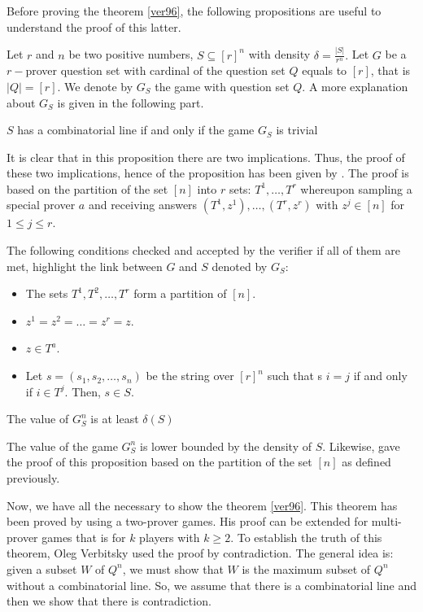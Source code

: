 Before proving the theorem \eqref{ver96}, the following propositions are useful to understand the proof of this latter.

Let $r$ and $n$ be two positive numbers,  $S \subseteq [r]^n$ with density $\delta=\frac{|S|}{r^n}.$ Let $G$ be a $r-$prover question set with  cardinal of the question set $Q$ equals to $[r]$, that is $|Q|=[r].$  We denote by $G_S$  the game with question set $Q$. A more explanation about $G_S$ is given in the following part.

\begin{pro} $S$ has a combinatorial line if and only if the game $G_S$ is trivial	 \label{pr1}	\end{pro}

It is clear that in this proposition there are two implications. Thus, the proof of these two implications, hence of the  proposition has been given by \cite{hkazla2016forbidden}. The proof is based on the partition of the set $[n]$ into $r$ sets: $T^1, \ldots, T^r$ whereupon sampling a special prover $a$ and receiving answers $(T^1, z^1), \ldots, (T^r, z^r)$ with $z^j \in [n]$ for $1\leq j \leq r.$ 

The following conditions checked and accepted  by the verifier  if all of them are met, highlight  the link between $G$ and $S$ denoted by $G_S$:
\begin{itemize}
\item The sets $T^1, T^2,\ldots, T^r$ form a partition of $[n].$
\item $z^1=z^2=\ldots=z^r=z.$
\item $z \in T^a.$
\item Let $s = (s_1, s_2, \ldots, s_n)$ be the string over $[r]^n$ such that s $i = j$ if and only if $i \in  T ^j.$ Then, $s \in S.$
\end{itemize}


\begin{pro}	 The value of $G_S^n$ is at least $\delta(S)$	\end{pro}

The value of the game $G_S^n$ is lower bounded by the density of $S.$ Likewise, \cite{hkazla2016forbidden} gave the proof of this proposition based on the partition of the set $[n]$ as defined previously.

Now, we have all the necessary to show the theorem \eqref{ver96}. This theorem  has been proved by \cite{verbitsky1996towards} using a two-prover games.  His proof can be extended for  multi-prover games that is for $k$ players with $k\geq 2.$ To establish the truth of  this theorem, Oleg Verbitsky used the proof by contradiction. The general idea is: given a subset $W$ of $Q^n$, we must show that $W$ is  the maximum subset of $Q^n$ without a combinatorial line.
So, we assume that there is a combinatorial line and then we show that there is  contradiction.

